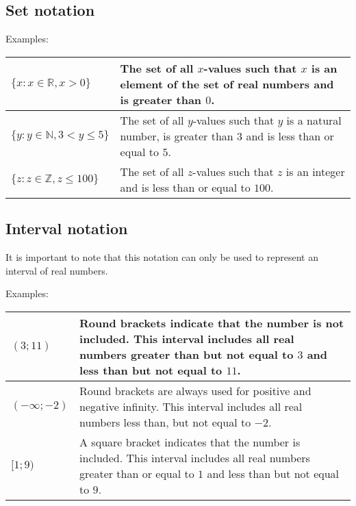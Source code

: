 \subsection*{Set notation}
Examples:
\\
\begin{table}[H]
\begin{tabular}{|p{5cm}|p{8cm}|}
\hline
  $\{x: x \in \mathbb{R}, x > 0\}$ &  The set of all $x$-values such that $x$ is an element of the set of real numbers and is greater than $0$.
\\ \hline
    $\{y: y \in \mathbb{N}, 3 < y \leq 5\}$ & The set of all
    $y$-values such that $y$ is a natural number, is greater than
    $3$ and is less than or equal to $5$.
\\ \hline
  $\{z: z \in \mathbb{Z}, z \leq 100\}$ & The set of all $z$-values such that $z$ is an integer and is less than or equal to $100$.  
\\ \hline
\end{tabular}
\end{table}
\subsection*{Interval notation}
It is important to note that this notation can only be used to represent an interval of real numbers.
\par
Examples:
\\
\begin{table}[H]
\begin{tabular}{|p{5cm}|p{8cm}|}
\hline
  $(3;11)$ &  Round brackets indicate that the number is not included. This interval includes all real numbers greater than but not equal to $3$ and less than but not equal to $11$.
\\ \hline
 $(- \infty; -2)$ & Round brackets are always used for positive and negative infinity. This interval includes all real numbers less than, but not equal to $-2$.
\\ \hline
 $[1; 9)$ & A square bracket indicates that the number is included. This interval includes all real numbers greater than or equal to $1$ and less than but not equal to $9$.
\\ \hline
\end{tabular}
\end{table}

